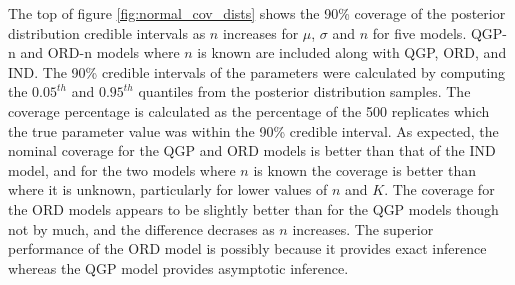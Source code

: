 % 


The top of figure \ref{fig:normal_cov_dists} shows the 90\% coverage of 
the posterior distribution credible intervals as $n$ increases for 
$\mu$, $\sigma$ and $n$ for five models. QGP-n and ORD-n models where $n$ is 
known are included along with QGP, ORD, and IND. 
The 90\% credible intervals of the 
parameters were calculated by computing the $0.05^{th}$ and $0.95^{th}$ 
quantiles from the posterior distribution samples. The coverage percentage is 
calculated as the percentage of the 500 replicates which the true parameter 
value was within the 90\% credible interval.
As expected, the nominal coverage for the QGP and ORD models is better than 
that of the IND model, and for the two models where $n$ is known the coverage 
is better than where it is unknown, particularly for lower values of 
$n$ and $K$. The coverage for the ORD models appears to be slightly better 
than for the QGP models though not by much, and the difference
decrases as $n$ increases. 
The superior performance of the ORD model is possibly because it
provides exact inference 
whereas the QGP model provides asymptotic inference.




